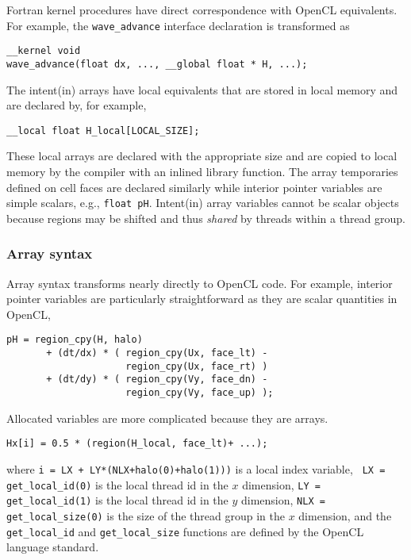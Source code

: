 Fortran kernel procedures have direct correspondence with OpenCL equivalents.
For example, the {\tt wave\_advance} interface declaration is transformed as
{\small
\begin{verbatim}
__kernel void
wave_advance(float dx, ..., __global float * H, ...);
\end{verbatim}
}
\noindent
The intent(in) arrays have local equivalents that are stored in local memory
and are declared by, for example,
{\small
\begin{verbatim}
__local float H_local[LOCAL_SIZE];
\end{verbatim}
}
\noindent
These local arrays are declared with the appropriate size and are
copied to local memory by the compiler with an inlined library function.  The
array temporaries defined on cell faces are declared similarly while interior
pointer variables are simple scalars, e.g., {\tt float pH}.  Intent(in) array
variables cannot be scalar objects because regions may be shifted and thus
\emph{shared} by threads within a thread group.

\subsubsection{Array syntax}

Array syntax transforms nearly directly to OpenCL code.  For example, interior
pointer variables are particularly straightforward as they are scalar quantities in
OpenCL,
{\small
\begin{verbatim}
pH = region_cpy(H, halo)
       + (dt/dx) * ( region_cpy(Ux, face_lt) -
                     region_cpy(Ux, face_rt) )
       + (dt/dy) * ( region_cpy(Vy, face_dn) -
                     region_cpy(Vy, face_up) );
\end{verbatim}
}
\noindent
Allocated variables are more complicated because they are arrays.
{\small
\begin{verbatim}
Hx[i] = 0.5 * (region(H_local, face_lt)+ ...);
\end{verbatim}
}
\noindent
where {\tt i = LX + LY*(NLX+halo(0)+halo(1)))} is a local index variable, {\tt
  LX = get\_local\_id(0)} is the local thread id in the $x$ dimension, {\tt LY =
  get\_local\_id(1)} is the local thread id in the $y$ dimension, {\tt NLX =
  get\_local\_size(0)} is the size of the thread group in the $x$ dimension, and
the {\tt get\_local\_id} and {\tt get\_local\_size} functions are defined by the
OpenCL language standard.
